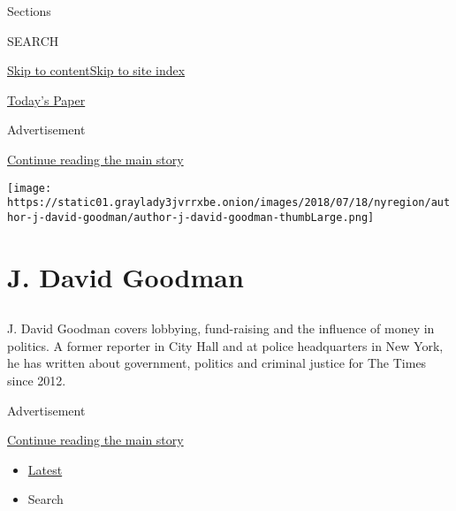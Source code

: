 Sections

SEARCH

\protect\hyperlink{site-content}{Skip to
content}\protect\hyperlink{site-index}{Skip to site index}

\href{https://myaccount.nytimes3xbfgragh.onion/auth/login?response_type=cookie\&client_id=vi}{}

\href{https://www.nytimes3xbfgragh.onion/section/todayspaper}{Today's
Paper}

Advertisement

\protect\hyperlink{after-top}{Continue reading the main story}

\texttt{[image: https://static01.graylady3jvrrxbe.onion/images/2018/07/18/nyregion/author-j-david-goodman/author-j-david-goodman-thumbLarge.png]}

\hypertarget{j-david-goodman}{%
\section{J. David Goodman}\label{j-david-goodman}}

\subsection{}

J. David Goodman covers lobbying, fund-raising and the influence of
money in politics. A former reporter in City Hall and at police
headquarters in New York, he has written about government, politics and
criminal justice for The Times since 2012.

Advertisement

\protect\hyperlink{after-mid1}{Continue reading the main story}

\begin{itemize}
\tightlist
\item
  \protect\hyperlink{stream-panel}{Latest}
\item
  Search
\end{itemize}

